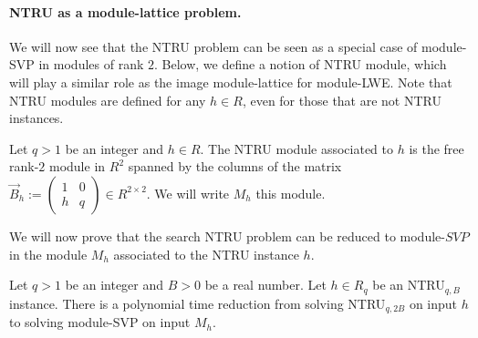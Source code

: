 
\paragraph{NTRU as a module-lattice problem.} We will now see that the NTRU problem can be seen as a special case of module-SVP in modules of rank $2$. Below, we define a notion of NTRU module, which will play a similar role as the image module-lattice for module-LWE. Note that NTRU modules are defined for any $h \in R$, even for those that are not NTRU instances.

\begin{definition}
Let $q > 1$ be an integer and $h \in R$. The NTRU module associated to $h$ is the free rank-$2$ module in $R^2$ spanned by the columns of the matrix
$\vec B_h := \begin{pmatrix}
1 & 0 \\
h & q
\end{pmatrix} \in R^{2 \times 2}$.
We will write $M_h$ this module.
\end{definition}

We will now prove that the search NTRU problem can be reduced to module-$SVP$ in the module $M_h$ associated to the NTRU instance $h$.

\begin{lemma}
Let $q >1$ be an integer and $B >0$ be a real number. Let $h \in R_q$ be an NTRU$_{q,B}$ instance. There is a polynomial time reduction from solving NTRU$_{q,2B}$ on input $h$ to solving module-SVP on input $M_h$.
\end{lemma}

